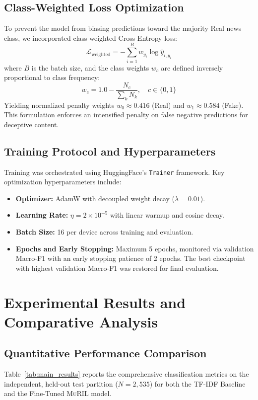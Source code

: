 \documentclass[11pt,a4paper]{article}
\begin{document}
\subsection{Class-Weighted Loss Optimization}
To prevent the model from biasing predictions toward the majority Real news class, we incorporated class-weighted Cross-Entropy loss:
\begin{equation}
\mathcal{L}_{\text{weighted}} = - \sum_{i=1}^{B} w_{y_i} \log \hat{y}_{i, y_i}
\end{equation}
where $B$ is the batch size, and the class weights $w_c$ are defined inversely proportional to class frequency:
\begin{equation}
w_c = 1.0 - \frac{N_c}{\sum_{k} N_k}, \quad c \in \{0, 1\}
\end{equation}
Yielding normalized penalty weights $w_0 \approx 0.416$ (Real) and $w_1 \approx 0.584$ (Fake). This formulation enforces an intensified penalty on false negative predictions for deceptive content.

\subsection{Training Protocol and Hyperparameters}
Training was orchestrated using HuggingFace's \texttt{Trainer} framework. Key optimization hyperparameters include:
\begin{itemize}[leftmargin=*]
    \item \textbf{Optimizer:} AdamW with decoupled weight decay ($\lambda = 0.01$).
    \item \textbf{Learning Rate:} $\eta = 2 \times 10^{-5}$ with linear warmup and cosine decay.
    \item \textbf{Batch Size:} 16 per device across training and evaluation.
    \item \textbf{Epochs and Early Stopping:} Maximum 5 epochs, monitored via validation Macro-F1 with an early stopping patience of 2 epochs. The best checkpoint with highest validation Macro-F1 was restored for final evaluation.
\end{itemize}

\section{Experimental Results and Comparative Analysis}
\label{sec:results}

\subsection{Quantitative Performance Comparison}
Table~\ref{tab:main_results} reports the comprehensive classification metrics on the independent, held-out test partition ($N=2,535$) for both the TF-IDF Baseline and the Fine-Tuned \textsc{MuRIL} model.
\end{document}
